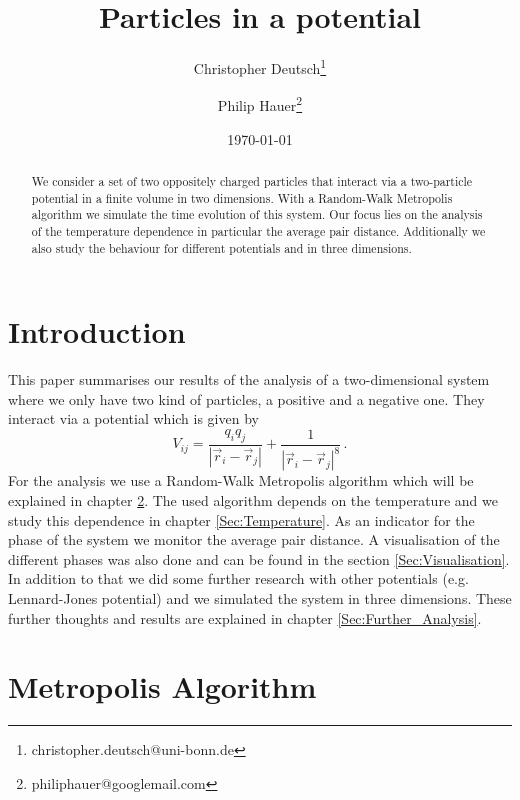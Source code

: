 \documentclass[11pt, a4paper]{article}
\title{Particles in a potential}
\author{Christopher Deutsch\footnote{christopher.deutsch@uni-bonn.de} \and Philip Hauer\footnote{philiphauer@googlemail.com}}
\date{\today}
\numberwithin{equation}{section}
\begin{document}
\begin{titlepage}

\maketitle

\begin{abstract}
\noindent 
We consider a set of two oppositely charged particles that interact via a two-particle potential in a finite volume in two dimensions. With a Random-Walk Metropolis algorithm we simulate the time evolution of this system. Our focus lies on the analysis of the temperature dependence in particular the average pair distance. Additionally we also study the behaviour for different potentials and in three dimensions.
\end{abstract}

\end{titlepage}

\tableofcontents
\newpage


\section{Introduction}
This paper summarises our results of the analysis of a two-dimensional system where we only have two kind of particles, a positive and a negative one. They interact via a potential which is given by
\begin{equation}
V_{ij} = \frac{q_i q_j}{\left| \vec{r}_i - \vec{r}_j \right|} + \frac{1}{\left| \vec{r}_i - \vec{r}_j \right|^8} \, .
\end{equation}
For the analysis we use a Random-Walk Metropolis algorithm which will be explained in chapter \ref{Sec:Metropolis}. The used algorithm depends on the temperature and we study this dependence in chapter \ref{Sec:Temperature}. As an indicator for the phase of the system we monitor the average pair distance. A visualisation of the different phases was also done and can be found in the section \ref{Sec:Visualisation}. In addition to that we did some further research with other potentials (e.g. Lennard-Jones potential) and we simulated the system in three dimensions. These further thoughts and results are explained in chapter \ref{Sec:Further_Analysis}.


\section{Metropolis Algorithm} \label{Sec:Metropolis}
\end{document}

